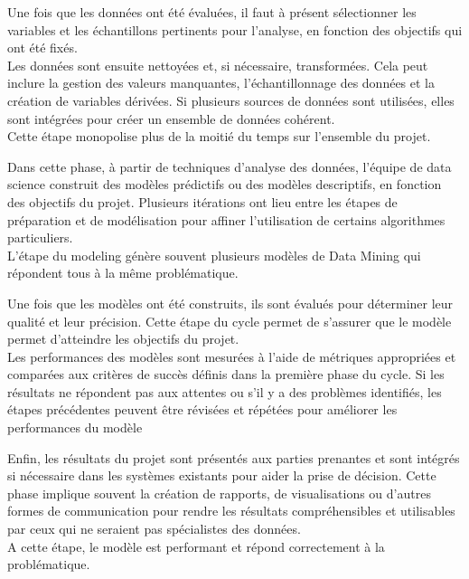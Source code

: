 \documentclass[a4paper,12pt]{article}
\begin{document}
            
            Une fois que les données ont été évaluées, il faut à présent sélectionner les variables et les échantillons pertinents pour l’analyse, en fonction des objectifs qui ont été fixés.\\ 
            Les données sont ensuite nettoyées et, si nécessaire, transformées. Cela peut inclure la gestion des valeurs manquantes, l'échantillonnage des données et la création de variables dérivées. Si plusieurs sources de données sont utilisées, elles sont intégrées pour créer un ensemble de données cohérent.\\ 
            Cette étape monopolise plus de la moitié du temps sur l’ensemble du projet.
            
            Dans cette phase, à partir de techniques d'analyse des données, l’équipe de data science construit des modèles prédictifs ou des modèles descriptifs, en fonction des objectifs du projet. Plusieurs itérations ont lieu entre les étapes de préparation et de modélisation pour affiner l’utilisation de certains algorithmes particuliers. \\
            L’étape du modeling génère souvent plusieurs modèles de Data Mining qui répondent tous à la même problématique.
    
            Une fois que les modèles ont été construits, ils sont évalués pour déterminer leur qualité et leur précision. Cette étape du cycle permet de s’assurer que le modèle permet d’atteindre les objectifs du projet. \\
            Les performances des modèles sont mesurées à l'aide de métriques appropriées et comparées aux critères de succès définis dans la première phase du cycle. Si les résultats ne répondent pas aux attentes ou s'il y a des problèmes identifiés, les étapes précédentes peuvent être révisées et répétées pour améliorer les performances du modèle
    
    
            Enfin, les résultats du projet sont présentés aux parties prenantes et sont intégrés si nécessaire dans les systèmes existants pour aider la prise de décision. Cette phase implique souvent la création de rapports, de visualisations ou d'autres formes de communication pour rendre les résultats compréhensibles et utilisables par ceux qui ne seraient pas spécialistes des données. \\
            A cette étape, le modèle est performant et répond correctement à la problématique.
\end{document}
